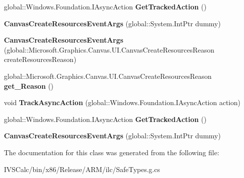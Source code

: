 \begin{DoxyCompactItemize}
\item 
\mbox{\label{class_microsoft_1_1_graphics_1_1_canvas_1_1_u_i_1_1_canvas_create_resources_event_args_adc12f96f4bcb8711da14472092a38891}} 
global\+::\+Windows.\+Foundation.\+I\+Async\+Action {\bfseries Get\+Tracked\+Action} ()
\item 
\mbox{\label{class_microsoft_1_1_graphics_1_1_canvas_1_1_u_i_1_1_canvas_create_resources_event_args_ae98b263ce96e012c6c79fb507af1887e}} 
{\bfseries Canvas\+Create\+Resources\+Event\+Args} (global\+::\+System.\+Int\+Ptr dummy)
\item 
\mbox{\label{class_microsoft_1_1_graphics_1_1_canvas_1_1_u_i_1_1_canvas_create_resources_event_args_a82b174b6991b45dae81601265385770c}} 
{\bfseries Canvas\+Create\+Resources\+Event\+Args} (global\+::\+Microsoft.\+Graphics.\+Canvas.\+U\+I.\+Canvas\+Create\+Resources\+Reason create\+Resources\+Reason)
\item 
\mbox{\label{class_microsoft_1_1_graphics_1_1_canvas_1_1_u_i_1_1_canvas_create_resources_event_args_ac34effc43e4224c4a19ddd6ff7883c3d}} 
global\+::\+Microsoft.\+Graphics.\+Canvas.\+U\+I.\+Canvas\+Create\+Resources\+Reason {\bfseries get\+\_\+\+Reason} ()
\item 
\mbox{\label{class_microsoft_1_1_graphics_1_1_canvas_1_1_u_i_1_1_canvas_create_resources_event_args_af4082e3d50efdfe88607e77abbf80871}} 
void {\bfseries Track\+Async\+Action} (global\+::\+Windows.\+Foundation.\+I\+Async\+Action action)
\item 
\mbox{\label{class_microsoft_1_1_graphics_1_1_canvas_1_1_u_i_1_1_canvas_create_resources_event_args_adc12f96f4bcb8711da14472092a38891}} 
global\+::\+Windows.\+Foundation.\+I\+Async\+Action {\bfseries Get\+Tracked\+Action} ()
\item 
\mbox{\label{class_microsoft_1_1_graphics_1_1_canvas_1_1_u_i_1_1_canvas_create_resources_event_args_ae98b263ce96e012c6c79fb507af1887e}} 
{\bfseries Canvas\+Create\+Resources\+Event\+Args} (global\+::\+System.\+Int\+Ptr dummy)
\end{DoxyCompactItemize}


The documentation for this class was generated from the following file\+:\begin{DoxyCompactItemize}
\item 
I\+V\+S\+Calc/bin/x86/\+Release/\+A\+R\+M/ilc/Safe\+Types.\+g.\+cs\end{DoxyCompactItemize}
